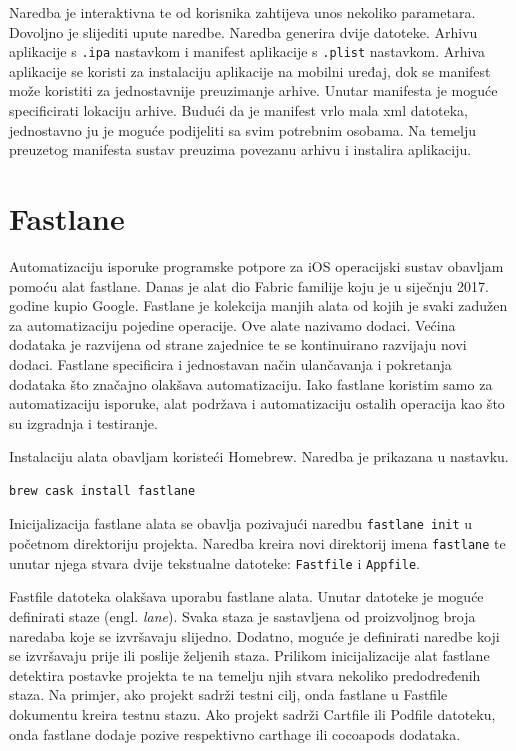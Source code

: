 \documentclass[times, utf8, diplomski, numeric]{fer}
\newcommand{\eng}[1]{(engl. \textit{#1})}
\begin{document}
\begin{appendices}
Naredba je interaktivna te od korisnika zahtijeva unos nekoliko parametara. Dovoljno je slijediti upute naredbe. Naredba generira dvije datoteke. Arhivu aplikacije s \verb|.ipa| nastavkom i manifest aplikacije s \verb|.plist| nastavkom. Arhiva aplikacije se koristi za instalaciju aplikacije na mobilni uređaj, dok se manifest može koristiti za jednostavnije preuzimanje arhive. Unutar manifesta je moguće specificirati lokaciju arhive. Budući da je manifest vrlo mala xml datoteka, jednostavno ju je moguće podijeliti sa svim potrebnim osobama. Na temelju preuzetog manifesta sustav preuzima povezanu arhivu i instalira aplikaciju.



\chapter{Fastlane} \label{header:dodatak_fastlane}

Automatizaciju isporuke programske potpore za iOS operacijski sustav obavljam pomoću alat fastlane. Danas je alat dio Fabric familije koju je u siječnju 2017. godine kupio Google. Fastlane je kolekcija manjih alata od kojih je svaki zadužen za automatizaciju pojedine operacije. Ove alate nazivamo dodaci. Većina dodataka je razvijena od strane zajednice te se kontinuirano razvijaju novi dodaci. Fastlane specificira i jednostavan način ulančavanja i pokretanja dodataka što značajno olakšava automatizaciju. Iako fastlane koristim samo za automatizaciju isporuke, alat podržava i automatizaciju ostalih operacija kao što su izgradnja i testiranje\citep{fastlane}.

Instalaciju alata obavljam koristeći Homebrew. Naredba je prikazana u nastavku.

\begin{verbatim}
brew cask install fastlane
\end{verbatim}

Inicijalizacija fastlane alata se obavlja pozivajući naredbu \verb|fastlane init| u početnom direktoriju projekta. Naredba kreira novi direktorij imena \verb|fastlane| te unutar njega stvara dvije tekstualne datoteke: \verb|Fastfile| i \verb|Appfile|.

Fastfile datoteka olakšava uporabu fastlane alata. Unutar datoteke je moguće definirati staze \eng{lane}. Svaka staza je sastavljena od proizvoljnog broja naredaba koje se izvršavaju slijedno. Dodatno, moguće je definirati naredbe koji se izvršavaju prije ili poslije željenih staza. Prilikom inicijalizacije alat fastlane detektira postavke projekta te na temelju njih stvara nekoliko predodređenih staza. Na primjer, ako projekt sadrži testni cilj, onda fastlane u Fastfile dokumentu kreira testnu stazu. Ako projekt sadrži Cartfile ili Podfile datoteku, onda fastlane dodaje pozive respektivno carthage ili cocoapods dodataka.


\end{appendices}
\end{document}
